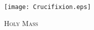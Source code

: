 \fancyhead[RE,LO]{}\fancyhead[RO,LE]{}
\fancyhead[C]{}\thispagestyle{empty}
{}
  \begin{center}
   \texttt{[image: Crucifixion.eps]}
   \par
   \vspace{2ex}
   	\textsc{\Huge{Holy Mass}}
   \end{center}